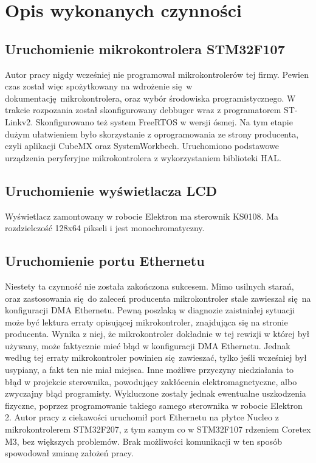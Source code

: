 \documentclass[10pt,a4paper]{article}
\begin{document}
	\section{Opis wykonanych czynności}
	\subsection{Uruchomienie mikrokontrolera STM32F107}
	Autor pracy nigdy wcześniej nie programował mikrokontrolerów tej firmy. Pewien czas został więc spożytkowany na wdrożenie się w dokumentację mikrokontrolera, oraz wybór środowiska programistycznego. W trakcie rozpozania został skonfigurowany debbuger wraz z programatorem ST-Linkv2. Skonfigurowano też system FreeRTOS w wersji ósmej. Na tym etapie dużym ułatwieniem było skorzystanie z oprogramowania ze strony producenta, czyli aplikacji CubeMX oraz SystemWorkbech. Uruchomiono podstawowe urządzenia peryferyjne mikrokontrolera z wykorzystaniem biblioteki HAL.
	\subsection{Uruchomienie wyświetlacza LCD}
	Wyświetlacz zamontowany w robocie Elektron ma sterownik KS0108. Ma rozdzielczość 128x64 pikseli i jest monochromatyczny.
	\subsection{Uruchomienie portu Ethernetu}
	Niestety ta czynność nie została zakończona sukcesem. Mimo usilnych starań, oraz zastosowania się do zaleceń producenta mikrokontroler stale zawieszał się na konfiguracji DMA Ethernetu. Pewną poszlaką w diagnozie zaistniałej sytuacji może być lektura erraty opisującej mikrokontroler, znajdująca się na stronie producenta. Wynika z niej, że mikrokontroler dokładnie w tej rewizji w której był używany, może faktycznie mieć błąd w konfiguracji DMA Ethernetu. Jednak według tej erraty mikrokontroler powinien się zawieszać, tylko jeśli wcześniej był usypiany, a fakt ten nie miał miejsca. Inne możliwe przyczyny niedziałania to błąd w projekcie sterownika, powodujący zakłócenia elektromagnetyczne, albo zwyczajny błąd programisty. Wykluczone zostały jednak ewentualne uszkodzenia fizyczne, poprzez programowanie takiego samego sterownika w robocie Elektron 2. Autor pracy z ciekawości uruchomił port Ethernetu na płytce Nucleo z mikrokontrolerem STM32F207, z tym samym co w STM32F107 rdzeniem Coretex M3, bez większych problemów. Brak możliwości komunikacji w ten sposób spowodował zmianę założeń pracy.
\end{document}
